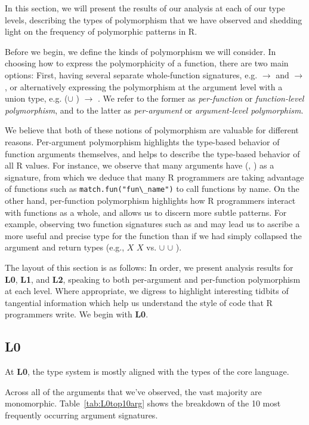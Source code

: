 \documentclass[acmsmall,10pt,review,anonymous]{acmart}\settopmatter{printfolios=true,printccs=false,printacmref=false}
\newcommand{\code}[1]{\lstinline|#1|\xspace}
\begin{document}
In this section, we will present the results of our analysis at each of our type levels, describing the types of polymorphism that we have observed and shedding light on the frequency of polymorphic patterns in R.

Before we begin, we define the kinds of polymorphism we will consider.
In choosing how to express the polymorphicity of a function, there are two main options:
First, having several separate whole-function signatures, e.g. \D $\rightarrow$ \D and \C $\rightarrow$ \D, or alternatively expressing the polymorphism at the argument level with a union type, e.g. (\D $\cup$ \C) $\rightarrow$ \C.
We refer to the former as {\it per-function} or {\it function-level polymorphism}, and to the latter as {\it per-argument} or {\it argument-level polymorphism}.

We believe that both of these notions of polymorphism are valuable for different reasons.
Per-argument polymorphism highlights the type-based behavior of function arguments themselves, and helps to describe the type-based behavior of all R values.
For instance, we observe that many arguments have (\sC, \sF) as a signature, from which we deduce that many R programmers are taking advantage of functions such as \code{match.fun("fun\_name")} to call functions by name.
On the other hand, per-function polymorphism highlights how R programmers interact with functions as a whole, and allows us to discern more subtle patterns.
For example, observing two function signatures such as \D \to \D and \sF \to \sF may lead us to ascribe a more useful and precise type for the function than if we had simply collapsed the argument and return types (e.g., $X$ \to $X$ vs. \D $\cup$ \sF \to \D $\cup$ \sF).

The layout of this section is as follows:
In order, we present analysis results for {\bf L0}, {\bf L1}, and {\bf L2}, speaking to both per-argument and per-function polymorphism at each level.
Where appropriate, we digress to highlight interesting tidbits of tangential information which help us understand the style of code that R programmers write.
We begin with {\bf L0}.

\subsection{L0}

At {\bf L0}, the type system is mostly aligned with the types of the core language.

Across all of the arguments that we've observed, the vast majority are monomorphic.
Table~\ref{tab:L0top10arg} shows the breakdown of the 10 most frequently occurring argument signatures.
\end{document}
